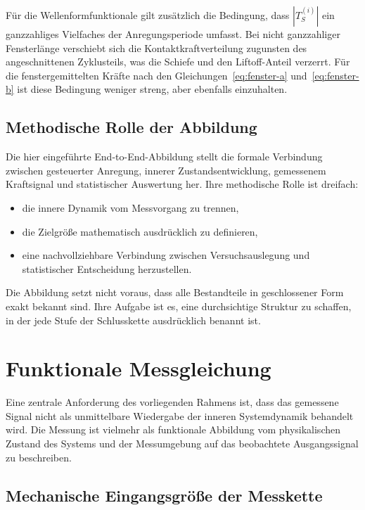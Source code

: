 \documentclass[12pt,a4paper]{report}
\begin{document}
Für die Wellenformfunktionale gilt zusätzlich die Bedingung, dass
$|T_S^{(i)}|$ ein ganzzahliges Vielfaches der Anregungsperiode umfasst.
Bei nicht ganzzahliger Fensterlänge verschiebt sich die
Kontaktkraftverteilung zugunsten des angeschnittenen Zyklusteils, was die
Schiefe und den Liftoff-Anteil verzerrt. Für die fenstergemittelten
Kräfte nach den Gleichungen~\eqref{eq:fenster-a}
und~\eqref{eq:fenster-b} ist diese Bedingung weniger streng, aber
ebenfalls einzuhalten.

\subsection{Methodische Rolle der Abbildung}

Die hier eingeführte End-to-End-Abbildung stellt die formale Verbindung
zwischen gesteuerter Anregung, innerer Zustandsentwicklung, gemessenem
Kraftsignal und statistischer Auswertung her. Ihre methodische Rolle ist
dreifach:

\begin{itemize}
\item die innere Dynamik vom Messvorgang zu trennen,
\item die Zielgröße mathematisch ausdrücklich zu definieren,
\item eine nachvollziehbare Verbindung zwischen Versuchsauslegung und
      statistischer Entscheidung herzustellen.
\end{itemize}

Die Abbildung setzt nicht voraus, dass alle Bestandteile in geschlossener
Form exakt bekannt sind. Ihre Aufgabe ist es, eine durchsichtige Struktur
zu schaffen, in der jede Stufe der Schlusskette ausdrücklich benannt ist.

\section{Funktionale Messgleichung}
\label{sec:messgleichung}

Eine zentrale Anforderung des vorliegenden Rahmens ist, dass das
gemessene Signal nicht als unmittelbare Wiedergabe der inneren
Systemdynamik behandelt wird. Die Messung ist vielmehr als funktionale
Abbildung vom physikalischen Zustand des Systems und der Messumgebung auf
das beobachtete Ausgangssignal zu beschreiben.

\subsection{Mechanische Eingangsgröße der Messkette}
\end{document}
